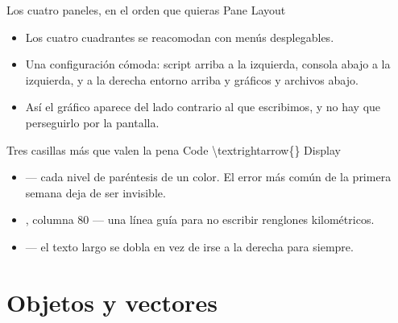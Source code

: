 \begin{frame}{Los cuatro paneles, en el orden que quieras}
  \vspace{0.2em}
  \ac{Pane Layout}

  \vspace{0.9em}
  \begin{itemize}\setlength{\itemsep}{0.8em}
    \item<1-> Los cuatro cuadrantes se reacomodan con menús desplegables.
    \item<2-> Una configuración cómoda: \ac{script arriba a la izquierda},
          \ac{consola abajo a la izquierda}, y a la derecha
          \ac{entorno} arriba y \ac{gráficos y archivos} abajo.
    \item<3-> Así el gráfico aparece del lado contrario al que escribimos,
          y no hay que perseguirlo por la pantalla.
  \end{itemize}

  \vspace{1.0em}
\end{frame}

\begin{frame}{Tres casillas más que valen la pena}
  \vspace{0.2em}
  \ac{Code \textrightarrow{} Display}

  \vspace{0.9em}
  \begin{itemize}\setlength{\itemsep}{0.8em}
    \item<1->  — cada nivel de paréntesis de un
          color. El error más común de la primera semana deja de ser
          invisible.
    \item<2-> , columna 80 — una línea guía para no
          escribir renglones kilométricos.
    \item<3->  — el texto largo se dobla en
          vez de irse a la derecha para siempre.
  \end{itemize}
\end{frame}

\section{Objetos y vectores}


